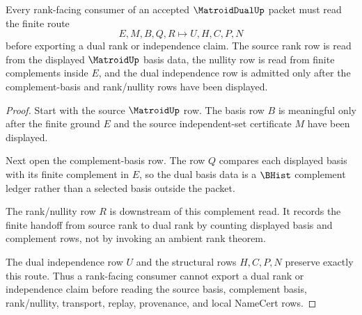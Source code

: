 \begin{theorem}
\label{thm:matroid-dual-rank-nullity-handoff}
Every rank-facing consumer of an accepted $\MatroidDualUp$ packet must read the finite route
$$
E,M,B,Q,R \longmapsto U,H,C,P,N
$$
before exporting a dual rank or independence claim. The source rank row is read from the displayed $\MatroidUp$ basis data, the nullity row is read from finite complements inside $E$, and the dual independence row is admitted only after the complement-basis and rank/nullity rows have been displayed.
\end{theorem}
\begin{proof}
Start with the source $\MatroidUp$ row. The basis row $B$ is meaningful only after the finite ground $E$ and the source independent-set certificate $M$ have been displayed.

Next open the complement-basis row. The row $Q$ compares each displayed basis with its finite complement in $E$, so the dual basis data is a $\BHist$ complement ledger rather than a selected basis outside the packet.

The rank/nullity row $R$ is downstream of this complement read. It records the finite handoff from source rank to dual rank by counting displayed basis and complement rows, not by invoking an ambient rank theorem.

The dual independence row $U$ and the structural rows $H,C,P,N$ preserve exactly this route. Thus a rank-facing consumer cannot export a dual rank or independence claim before reading the source basis, complement basis, rank/nullity, transport, replay, provenance, and local NameCert rows.
\end{proof}





